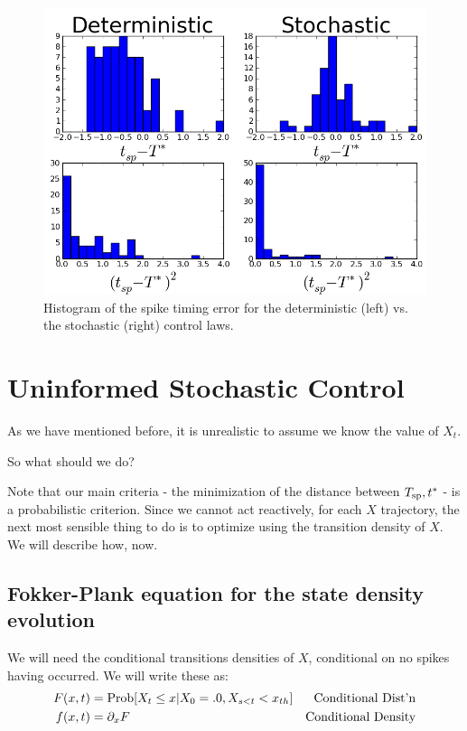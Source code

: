 \documentclass{article}
\begin{document}
\begin{figure}[htp]
\begin{center}
  \includegraphics[width=.9\textwidth]{Figs/ControlSimulator/example_controlled_trajectories_hists.png}
  \caption[labelInTOC]{Histogram of the spike timing error for the
  deterministic (left) vs. the stochastic (right) control laws.}
  \label{fig:error_histograms_det_vs_stoch}
\end{center}
\end{figure}





\section{Uninformed Stochastic Control}
As we have mentioned before, it is unrealistic to assume we know the value of
$X_t$.

So what should we do?

Note that our main criteria - the minimization of the distance between ${ T_{\textrm{sp} } },{ t^* }$
- is a probabilistic criterion. Since we cannot act reactively, for each
$X$ trajectory, the next most sensible thing to do is to optimize using the
transition density of $X$. We will describe how, now.

\subsection{Fokker-Plank equation for the state density evolution}
We will need the conditional transitions densities of $X$, conditional on no
spikes having occurred. We will write these as:
\begin{align*}
F(x,t) &= \operatorname{Prob}[X_t \leq x| X_0 = .0, X_{s<t} < { x_{th} }] &\textrm{Conditional
Dist'n}
\\
f(x,t) &= {\partial}_x F  								   &\textrm{Conditional Density}
\end{align*}
\end{document}
